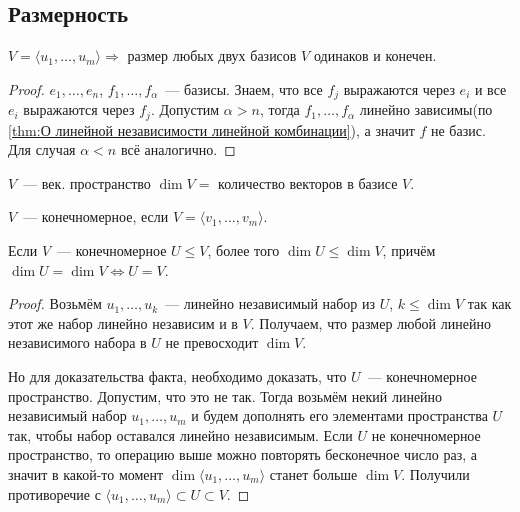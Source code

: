 \subsection{Размерность}
\begin{theorem}
    $V = \langle u_1,\dots,u_m\rangle \Rightarrow$ размер любых двух базисов $V$ одинаков и конечен.
\end{theorem}
\begin{proof}
    $e_1,\dots,e_n$, $f_1,\dots,f_\alpha$~--- базисы. Знаем, что все $f_j$
    выражаются через $e_i$ и все $e_i$ выражаются через $f_j$.
    Допустим $\alpha > n$, тогда $f_1,\dots,f_\alpha$ линейно зависимы(по \ref{thm:О линейной независимости линейной комбинации}), а значит $f$ не базис.
    Для случая $\alpha < n$ всё аналогично.
\end{proof}
\begin{definition}
    $V$~--- век. пространство $\dim V =$ количество векторов в базисе $V$.
\end{definition}
\begin{definition}
    $V$~--- конечномерное, если $V = \langle v_1,\dots, v_m\rangle$.
\end{definition}
\begin{lemma}
    Если $V$~--- конечномерное $U \leq V$, более того $\dim U \leq \dim V$, причём $\dim U = \dim V \Leftrightarrow U=V$.
\end{lemma}
\begin{proof}
    Возьмём $u_1,\dots,u_k$~--- линейно независимый набор из $U$, $k\leq \dim V$ так как этот же набор линейно независим и в $V$. 
    Получаем, что размер любой линейно независимого набора в $U$ не превосходит $\dim V$.

    Но для доказательства факта, необходимо доказать, что $U$~--- конечномерное пространство. Допустим, что это не так.
    Тогда возьмём некий линейно независимый набор $u_1,\dots, u_m$ и будем дополнять его элементами пространства $U$ так, чтобы набор оставался линейно независимым.
    Если $U$ не конечномерное пространство, то операцию выше можно повторять бесконечное число раз,
    а значит в какой-то момент $\dim\langle u_1, \dots, u_m\rangle$ станет больше $\dim V$. 
    Получили противоречие с $\langle u_1, \dots, u_m\rangle \subset U \subset V$.
\end{proof}
